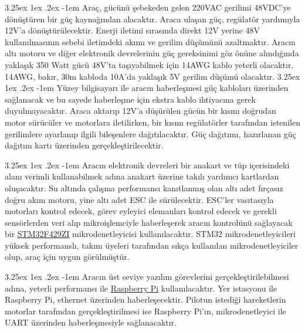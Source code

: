 \documentclass[12pt]{article}
\makeatletter
\newcounter{subsubsubsection}[subsubsection]
\renewcommand\paragraph{\@startsection{paragraph}{5}{\z@}%
  {3.25ex \@plus1ex \@minus.2ex}%
  {-1em}%
  {\normalfont\normalsize\bfseries}}
\makeatother
\begin{document}

\paragraph{} Araç, gücünü şebekeden gelen 220VAC gerilimi 48VDC'ye dönüştüren bir güç kaynağından alacaktır. Araca ulaşan güç, regülatör yardımıyla 12V'a dönüştürülecektir. Enerji iletimi sırasında direkt 12V yerine 48V kullanılmasının sebebi iletimdeki akımı ve gerilim düşümünü azaltmaktır. Aracın altı motoru ve diğer elektronik devrelerinin güç gereksinimi göz önüne alındığında yaklaşık 350 Watt gücü 48V'ta taşıyabilmek için 14AWG kablo yeterli olacaktır. 14AWG, bakır, 30m kabloda 10A'da yaklaşık 5V gerilim düşümü olacaktır. 
\newpage
\paragraph{}Yüzey bilgisayarı ile aracın haberleşmesi güç kabloları üzerinden sağlanacak ve bu sayede haberleşme için ekstra kablo ihtiyacına gerek duyulmayacaktır. Araca aktarıp 12V'a düşürülen gücün bir kısmı doğrudan motor sürücüler ve motorlara iletilirken, bir kısmı regülatörler tarafından istenilen gerilimlere ayarlanıp ilgili bileşenlere dağıtılacaktır. Güç dağıtımı, hazırlanan güç dağıtım kartı üzerinden gerçekleştirilecektir.


\paragraph{} Aracın elektronik devreleri bir anakart ve tüp içerisindeki alanı verimli kullanabilmek adına anakart üzerine takılı yardımcı kartlardan oluşacaktır. Su altında çalışma performansı kanıtlanmış olan altı adet fırçasız doğru akım motoru, yine altı adet ESC ile sürülecektir. ESC'ler vasıtasıyla motorları kontrol edecek, görev eyleyici elemanları kontrol edecek ve gerekli sensörlerden veri alıp mikroişlemciyle haberleşerek aracın kontrolünü sağlayacak bir \href{https://www.st.com/en/microcontrollers-microprocessors/stm32f429zi.html}{STM32F429ZI} mikrodenetleyicisi kullanılacaktır. STM32 mikrodenetleyicileri yüksek performanslı, takım üyeleri tarafından sıkça kullanılan mikrodenetleyiciler olup, araç için uygun görülmüştür. 

\paragraph{} Aracın üst seviye yazılım görevlerini gerçekleştirilebilmesi adına, yeterli performansı ile \href{https://www.raspberrypi.org/products/raspberry-pi-3-model-b}{Raspberry Pi} kullanılacaktır. Yer istasyonu ile Raspberry Pi, ethernet üzerinden haberleşecektir. Pilotun istediği hareketlerin motorlar tarafından gerçekleştirilmesi ise Raspberry Pi'ın, mikrodenetleyici ile UART üzerinden haberleşmesiyle sağlanacaktır.
\end{document}
